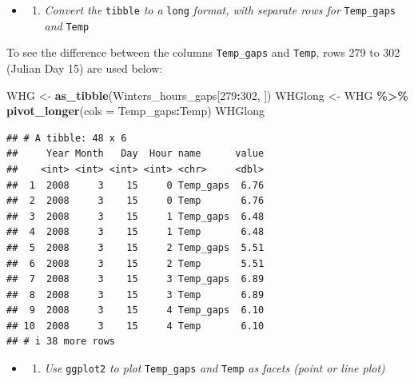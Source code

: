 \documentclass[
]{article}
\newenvironment{Shaded}{\begin{snugshade}}{\end{snugshade}}
\newcommand{\AttributeTok}[1]{\textcolor[rgb]{0.13,0.29,0.53}{#1}}
\newcommand{\DecValTok}[1]{\textcolor[rgb]{0.00,0.00,0.81}{#1}}
\newcommand{\FunctionTok}[1]{\textcolor[rgb]{0.13,0.29,0.53}{\textbf{#1}}}
\newcommand{\NormalTok}[1]{#1}
\newcommand{\OtherTok}[1]{\textcolor[rgb]{0.56,0.35,0.01}{#1}}
\newcommand{\SpecialCharTok}[1]{\textcolor[rgb]{0.81,0.36,0.00}{\textbf{#1}}}
\providecommand{\tightlist}{%
  \setlength{\itemsep}{0pt}\setlength{\parskip}{0pt}}
\begin{document}
\begin{itemize}
\tightlist
\item
  \begin{enumerate}
  \def\labelenumi{\alph{enumi})}
  \setcounter{enumi}{2}
  \tightlist
  \item
    \emph{Convert the} \texttt{tibble} \emph{to a} \texttt{long} \emph{format, with separate rows for} \texttt{Temp\_gaps} \emph{and} \texttt{Temp}
  \end{enumerate}
\end{itemize}

To see the difference between the columns \texttt{Temp\_gaps} and \texttt{Temp}, rows 279 to 302 (Julian Day 15) are used below:

\begin{Shaded}
\begin{Highlighting}[]
\NormalTok{WHG }\OtherTok{\textless{}{-}} \FunctionTok{as\_tibble}\NormalTok{(Winters\_hours\_gaps[}\DecValTok{279}\SpecialCharTok{:}\DecValTok{302}\NormalTok{, ])}
\NormalTok{WHGlong }\OtherTok{\textless{}{-}}\NormalTok{ WHG }\SpecialCharTok{\%\textgreater{}\%} \FunctionTok{pivot\_longer}\NormalTok{(}\AttributeTok{cols =}\NormalTok{ Temp\_gaps}\SpecialCharTok{:}\NormalTok{Temp)}
\NormalTok{WHGlong}
\end{Highlighting}
\end{Shaded}

\begin{verbatim}
## # A tibble: 48 x 6
##     Year Month   Day  Hour name      value
##    <int> <int> <int> <int> <chr>     <dbl>
##  1  2008     3    15     0 Temp_gaps  6.76
##  2  2008     3    15     0 Temp       6.76
##  3  2008     3    15     1 Temp_gaps  6.48
##  4  2008     3    15     1 Temp       6.48
##  5  2008     3    15     2 Temp_gaps  5.51
##  6  2008     3    15     2 Temp       5.51
##  7  2008     3    15     3 Temp_gaps  6.89
##  8  2008     3    15     3 Temp       6.89
##  9  2008     3    15     4 Temp_gaps  6.10
## 10  2008     3    15     4 Temp       6.10
## # i 38 more rows
\end{verbatim}

\begin{itemize}
\tightlist
\item
  \begin{enumerate}
  \def\labelenumi{\alph{enumi})}
  \setcounter{enumi}{3}
  \tightlist
  \item
    \emph{Use} \texttt{ggplot2} \emph{to plot} \texttt{Temp\_gaps} \emph{and} \texttt{Temp} \emph{as facets (point or line plot)}
  \end{enumerate}
\end{itemize}
\end{document}

